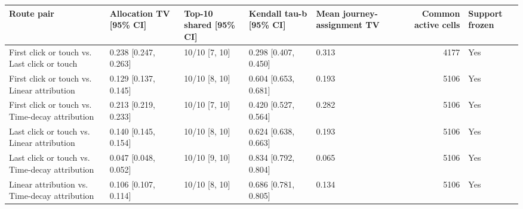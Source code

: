 \begin{tabular}{lllllrl}
\toprule
Route pair & Allocation TV [95\% CI] & Top-10 shared [95\% CI] & Kendall tau-b [95\% CI] & Mean journey-assignment TV & Common active cells & Support frozen \\
\midrule
First click or touch vs. Last click or touch & 0.238 [0.247, 0.263] & 10/10 [7, 10] & 0.298 [0.407, 0.450] & 0.313 & 4177 & Yes \\
First click or touch vs. Linear attribution & 0.129 [0.137, 0.145] & 10/10 [8, 10] & 0.604 [0.653, 0.681] & 0.193 & 5106 & Yes \\
First click or touch vs. Time-decay attribution & 0.213 [0.219, 0.233] & 10/10 [7, 10] & 0.420 [0.527, 0.564] & 0.282 & 5106 & Yes \\
Last click or touch vs. Linear attribution & 0.140 [0.145, 0.154] & 10/10 [8, 10] & 0.624 [0.638, 0.663] & 0.193 & 5106 & Yes \\
Last click or touch vs. Time-decay attribution & 0.047 [0.048, 0.052] & 10/10 [9, 10] & 0.834 [0.792, 0.804] & 0.065 & 5106 & Yes \\
Linear attribution vs. Time-decay attribution & 0.106 [0.107, 0.114] & 10/10 [8, 10] & 0.686 [0.781, 0.805] & 0.134 & 5106 & Yes \\
\bottomrule
\end{tabular}
